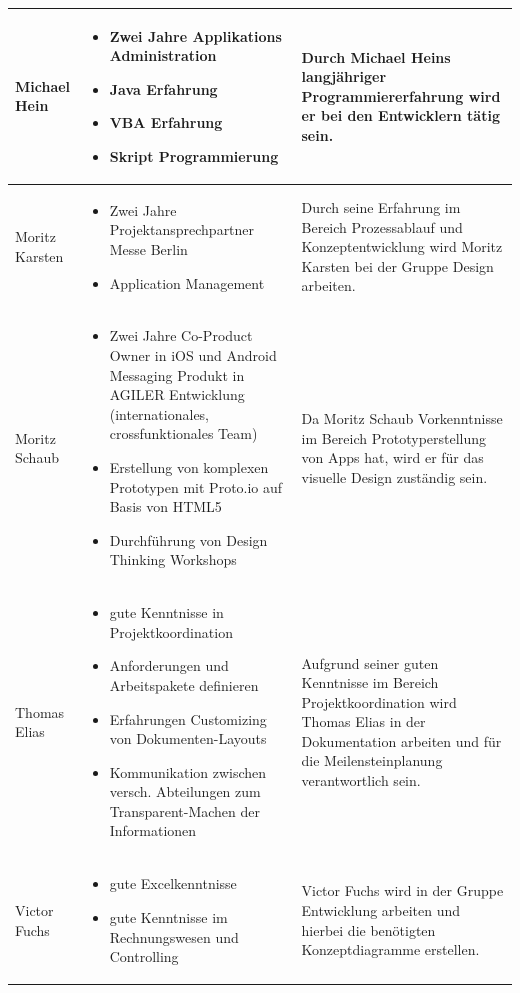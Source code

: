 \documentclass[12pt,a4paper]{article}
\begin{document}
\begin{tabular}{|m{5cm}|m{5cm}|m{5cm}|}
\\
\hline
\centering Michael Hein & \begin {itemize}
\item Zwei Jahre Applikations Administration
\item Java Erfahrung
\item VBA Erfahrung
\item Skript Programmierung
\end {itemize}
& Durch Michael Heins langjähriger Programmiererfahrung wird er bei den Entwicklern tätig sein.

\\
\hline
\centering Moritz Karsten & \begin {itemize}
\item  Zwei Jahre Projektansprechpartner Messe Berlin
\item  Application Management
\end {itemize}
& Durch seine Erfahrung im Bereich Prozessablauf und Konzeptentwicklung wird Moritz Karsten bei der Gruppe Design arbeiten.
\\
\hline
\centering Moritz Schaub & \begin {itemize}
\item  Zwei Jahre Co-Product Owner in iOS und Android Messaging Produkt in AGILER Entwicklung (internationales, crossfunktionales Team)
\item  Erstellung von komplexen Prototypen mit Proto.io auf Basis von HTML5
\item Durchführung von Design Thinking Workshops
\end {itemize}
& Da Moritz Schaub Vorkenntnisse im Bereich Prototyperstellung von Apps hat, wird er für das visuelle Design zuständig sein.

\\
\hline
\centering Thomas Elias & \begin {itemize}
\item gute Kenntnisse in Projektkoordination
\item Anforderungen und Arbeitspakete definieren
\item Erfahrungen Customizing von Dokumenten-Layouts
\item Kommunikation zwischen versch. Abteilungen zum Transparent-Machen der Informationen
\end {itemize}
& Aufgrund seiner guten Kenntnisse im Bereich Projektkoordination wird Thomas Elias in der Dokumentation arbeiten und für die Meilensteinplanung verantwortlich sein.

\\
\hline
\centering Victor Fuchs & \begin {itemize}
\item  gute Excelkenntnisse
\item  gute Kenntnisse im Rechnungswesen und Controlling
\end {itemize}
& Victor Fuchs wird in der Gruppe Entwicklung arbeiten und hierbei die benötigten Konzeptdiagramme erstellen.

\end{tabular}
\newline
\newline
\end{document}
